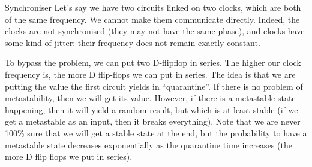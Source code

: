 \documentclass[a4paper]{article}
\begin{document}
\begin{parag}{Synchroniser}
    Let's say we have two circuits linked on two clocks, which are both of the same frequency. We cannot make them communicate directly. Indeed, the clocks are not synchronised (they may not have the same phase), and clocks have some kind of jitter: their frequency does not remain exactly constant.

    To bypass the problem, we can put two D-flipflop in series. The higher our clock frequency is, the more D flip-flops we can put in series. The idea is that we are putting the value the first circuit yields in ``quarantine''. If there is no problem of metastability, then we will get its value. However, if there is a metastable state happening, then it will yield a random result, but which is at least stable (if we get a metastable as an input, then it breaks everything). Note that we are never 100\% sure that we will get a stable state at the end, but the probability to have a metastable state decreases exponentially as the quarantine time increases (the more D flip flops we put in series).

\end{parag}
\end{document}
